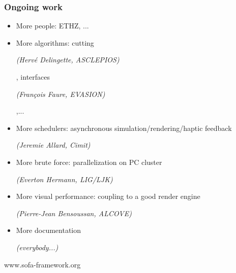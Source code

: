 \documentclass[a4paper,compress]{beamer}
\begin{document}
\begin{frame}
\frametitle{Ongoing work}
\begin{itemize}
\item More people: ETHZ, ...
\item More algorithms: cutting \begin{small}\textit{(Herv\'e Delingette, ASCLEPIOS)}\end{small}, interfaces \begin{small}\textit{(Fran\c{c}ois Faure, EVASION)}\end{small},... 
\item More schedulers: asynchronous simulation/rendering/haptic feedback \begin{small}\textit{(Jeremie Allard, Cimit)}\end{small}
\item More brute force: parallelization on PC cluster \begin{small}\em (Everton Hermann, LIG/LJK)\end{small}
\item More visual performance: coupling to a good render engine \begin{small}\textit{ (Pierre-Jean Bensoussan, ALCOVE)}\end{small}
\item More documentation \begin{small}\textit{(everybody...)}\end{small}
\end{itemize}

\vspace{1cm}
\begin{center}
\Large
 www.sofa-framework.org
\end{center}


\end{frame}
\end{document}
